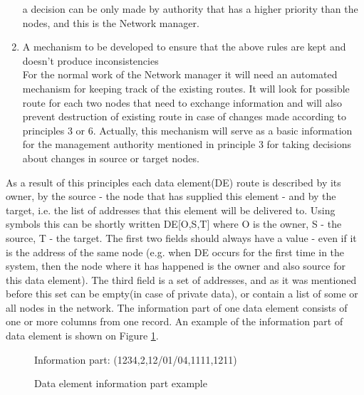 \begin{enumerate}
a decision can be only made by authority that has a higher priority
than the nodes, and this is the Network manager.
\item A mechanism to be developed to ensure that the above rules are kept
and doesn't produce inconsistencies\\
For the normal work of the Network manager it will need an automated
mechanism for keeping track of the existing routes. It will look for
possible route for each two nodes that need to exchange information
and will also prevent destruction of existing route in case of changes
made according to principles 3 or 6. Actually, this mechanism will
serve as a basic information for the management authority mentioned
in principle 3 for taking decisions about changes in source or target
nodes.
\end{enumerate}
As a result of this principles each data element(DE) route is described
by its owner, by the source - the node that has supplied this element
- and by the target, i.e. the list of addresses that this element
will be delivered to. Using symbols this can be shortly written DE{[}O,S,T{]}
where O is the owner, S - the source, T - the target. The first two
fields should always have a value - even if it is the address of the
same node (e.g. when DE occurs for the first time in the system, then
the node where it has happened is the owner and also source for this
data element). The third field is a set of addresses, and as it was
mentioned before this set can be empty(in case of private data), or
contain a list of some or all nodes in the network. The information
part of one data element consists of one or more columns from one
record. An example of the information part of data element is shown
on Figure \ref{cap:Data-element-example}. %
\begin{figure}

\caption{Data element information part example\label{cap:Data-element-example}}


\begin{center}Information part: (1234,2,12/01/04,1111,1211)\end{center}
\end{figure}
